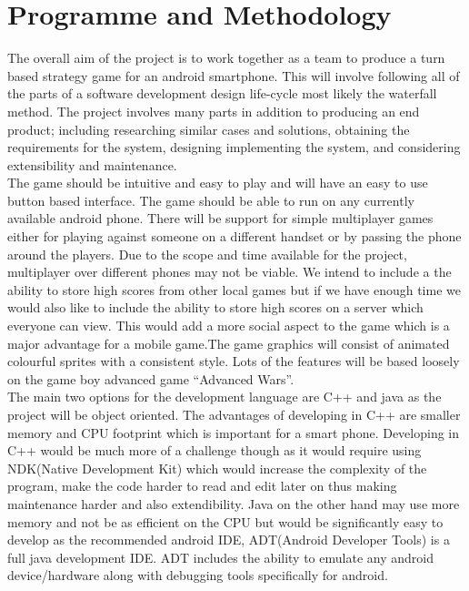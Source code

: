 \documentclass[10pt,a4paper,oneside]{report}
\begin{document}
\clearpage
\section*{Programme and Methodology}

The overall aim of the project is to work together as a team to produce a turn based strategy game for an android smartphone. This will involve following all of the parts of a software development design life-cycle most likely the waterfall method. The project involves many parts in addition to producing an end product; including researching similar cases and solutions, obtaining the requirements for the system, designing implementing the system, and considering extensibility and maintenance.\\


The game should be intuitive and easy to play and will have an easy to use button based interface. The game should be able to run on any currently available android phone. There will be support for simple multiplayer games either for playing against someone on a different handset or by passing the phone around the players. Due to the scope and time available for the project, multiplayer over different phones may not be viable.  We intend to include a  the ability to store high scores from other  local games  but if we have enough time we would also like to include the ability to store high scores on a server which everyone can view. This would add a more social aspect to the game which is a major advantage for a mobile game.The game graphics will consist of animated colourful sprites with a consistent style. Lots of the features will be based loosely on the game boy advanced game ``Advanced Wars''.\\


The main two options for the development language are C++ and java as the project will be object oriented. The advantages of developing in C++ are smaller memory and CPU footprint which is important for a smart phone. Developing in C++ would be much more of a challenge though as it would require using NDK(Native Development Kit) which would increase the complexity of the program, make the code harder to read and edit later on thus making maintenance harder and also extendibility. Java on the other hand may use more memory and not be as efficient on the CPU but would be significantly easy to develop as the recommended android IDE, ADT(Android Developer Tools) is a full java development IDE. ADT includes the ability to emulate any android device/hardware along with debugging tools specifically for android.\\
\end{document}
